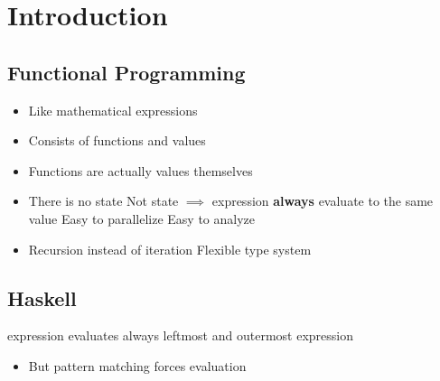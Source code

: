 
\section{Introduction}
\subsection{Functional Programming}
\begin{itemize}
    \item Like mathematical expressions
    \item Consists of functions and values
    \item Functions are actually values themselves
    \item There is no state
     Not state $\implies$ expression \textbf{always} evaluate to the same value
    \ipro Easy to parallelize
    \ipro Easy to analyze
    \item Recursion instead of iteration
    \ipro Flexible type system
\end{itemize}

\subsection{Haskell}
\begin{itemize}
     expression evaluates always leftmost and outermost expression
        \begin{itemize}
            \item But pattern matching forces evaluation
        \end{itemize}
\end{itemize}

